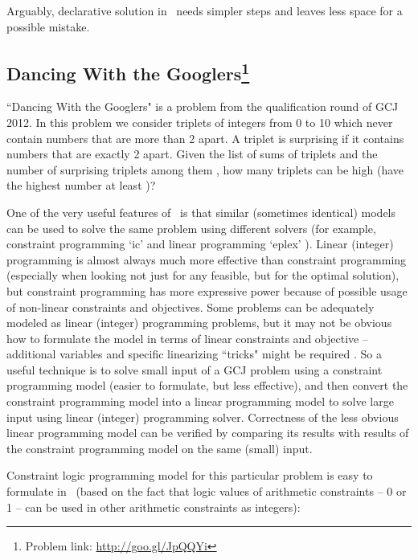 \documentclass{acm_proc_article-sp}
\begin{document}
Arguably, declarative solution in \eclipse\ needs simpler steps and leaves less space for a possible mistake.

\subsection*{Dancing With the Googlers\footnote{Problem link: \url{http://goo.gl/JpQQYi}}}

``Dancing With the Googlers" is a problem from the qualification round of GCJ 2012.
In this problem we consider triplets of integers from 0 to 10 which
never contain numbers that are more than 2 apart. A triplet is
surprising if it contains numbers that are exactly 2 apart. Given the list of
sums of  triplets and the number of surprising triplets among them
, how many triplets can be high (have the highest number at least )?
 
One of the very useful features of \eclipse\ is that similar (sometimes identical) models can be used to solve the same problem using different solvers
(for example, constraint programming `ic' and linear programming `eplex' \cite{shen2005eplex}).
Linear (integer) programming is almost always much more effective than constraint programming (especially when looking not just for any feasible, but for the optimal solution), 
but constraint programming has more expressive power because of possible usage of non-linear constraints and objectives.
Some problems can be adequately modeled as linear (integer) programming problems, but it may not be obvious how to formulate the model in terms of linear constraints and objective --
additional variables and specific linearizing ``tricks" might be required \cite{williams2013model,aimms-model,lpsolve-abs}.
So a useful technique is to solve small input of a GCJ problem using a constraint programming model (easier to formulate, but less effective), 
and then convert the constraint programming model into a linear programming model to solve large input using linear (integer) programming solver.
Correctness of the less obvious linear programming model can be verified by comparing its results with results of the constraint programming model on the same (small) input.

Constraint logic programming model for this particular problem is easy to formulate in \eclipse\ 
(based on the fact that logic values of arithmetic constraints -- 0 or 1 -- can be used in other arithmetic constraints as integers):
\end{document}
